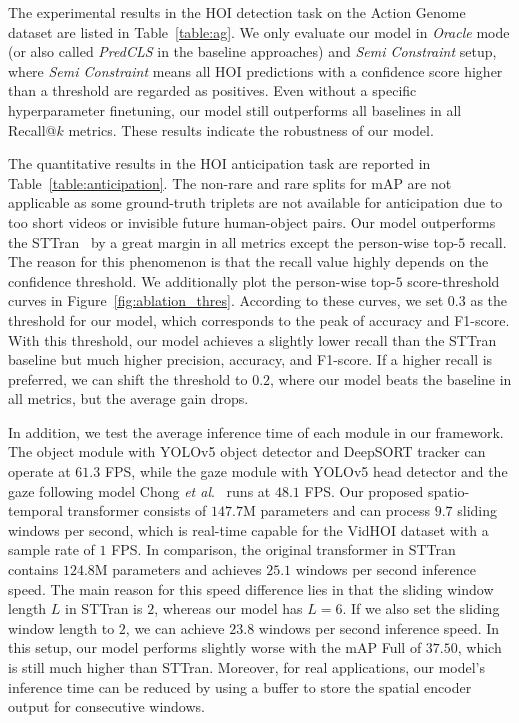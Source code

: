 \documentclass[times,twocolumn,final,authoryear]{elsarticle}
\makeatletter
\newcommand{\etal}{\emph{et al}.\@}
\makeatother
\begin{document}
The experimental results in the HOI detection task on the Action Genome dataset are listed in Table~\ref{table:ag}. We only evaluate our model in \emph{Oracle} mode (or also called \emph{PredCLS} in the baseline approaches) and \emph{Semi Constraint} setup, where \emph{Semi Constraint} means all HOI predictions with a confidence score higher than a threshold are regarded as positives. Even without a specific hyperparameter finetuning, our model still outperforms all baselines in all Recall@$k$ metrics. These results indicate the robustness of our model.  

The quantitative results in the HOI anticipation task are reported in Table~\ref{table:anticipation}. The non-rare and rare splits for mAP are not applicable as some ground-truth triplets are not available for anticipation due to too short videos or invisible future human-object pairs. Our model outperforms the STTran~\citep{hoi_v2:sttran} by a great margin in all metrics except the person-wise top-$5$ recall. The reason for this phenomenon is that the recall value highly depends on the confidence threshold. We additionally plot the person-wise top-$5$ score-threshold curves in Figure~\ref{fig:ablation_thres}. According to these curves, we set $0.3$ as the threshold for our model, which corresponds to the peak of accuracy and F1-score. With this threshold, our model achieves a slightly lower recall than the STTran baseline but much higher precision, accuracy, and F1-score. If a higher recall is preferred, we can shift the threshold to $0.2$, where our model beats the baseline in all metrics, but the average gain drops. 

In addition, we test the average inference time of each module in our framework. The object module with YOLOv5 object detector and DeepSORT tracker can operate at $61.3$ FPS, while the gaze module with YOLOv5 head detector and the gaze following model Chong \etal~\citep{gaze:detecting_attended} runs at $48.1$ FPS. Our proposed spatio-temporal transformer consists of $147.7$M parameters and can process $9.7$ sliding windows per second, which is real-time capable for the VidHOI dataset with a sample rate of $1$ FPS. In comparison, the original transformer in STTran~\citep{hoi_v2:sttran} contains $124.8$M parameters and achieves $25.1$ windows per second inference speed. The main reason for this speed difference lies in that the sliding window length $L$ in STTran is $2$, whereas our model has $L=6$. If we also set the sliding window length to $2$, we can achieve $23.8$ windows per second inference speed. In this setup, our model performs slightly worse with the mAP Full of $37.50$, which is still much higher than STTran. Moreover, for real applications, our model's inference time can be reduced by using a buffer to store the spatial encoder output for consecutive windows. 
\end{document}
